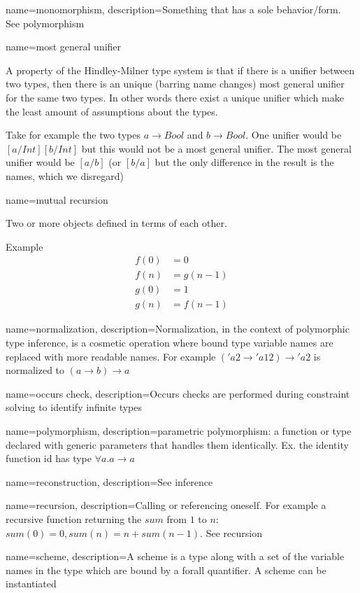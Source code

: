 { name={monomorphism},
  description={Something that has a sole behavior/form. See polymorphism}
}

{ name={most general unifier} }
{A property of the Hindley-Milner type system is that if there is a unifier between two types, then there is an unique (barring name changes) most general unifier for the same two types. In other words there exist a unique unifier which make the least amount of assumptions about the types.

Take for example the two types $a \to Bool$ and $b \to Bool$. One unifier would be
$[a/Int][b/Int]$ but this would not be a most general unifier. The most general unifier would be $[a/b]$ (or $[b/a]$ but the only difference in the result is the names, which we disregard)}

{ name={mutual recursion} }
{Two or more objects defined in terms of each other.

Example
\begin{align*}
f(0) &= 0 \\
f(n) &= g(n-1) \\
g(0) &= 1 \\
g(n) &= f(n-1)
\end{align*}
}

{ name={normalization},
  description={Normalization, in the context of polymorphic type inference, is a cosmetic operation where bound type variable names are replaced with more readable names. For example $('a2 \to 'a12) \to 'a2$ is normalized to $(a \to b) \to a$}
}

{ name={occurs check},
  description={Occurs checks are performed during constraint solving to identify infinite types}
}

{ name={polymorphism},
  description={parametric polymorphism: a function or type declared with generic parameters that handles them identically. Ex. the identity function id has type $\forall a . a \to a$}
}

{ name={reconstruction},
  description={See inference}
}

{ name={recursion},
  description={Calling or referencing oneself. For example a recursive function returning the $sum$ from $1$ to $n$: $sum(0) = 0, sum(n) = n + sum(n-1)$.
See recursion}
}

{ name={scheme},
  description={A scheme is a type along with a set of the variable names in the type which are bound by a forall quantifier. A scheme can be instantiated}
}

